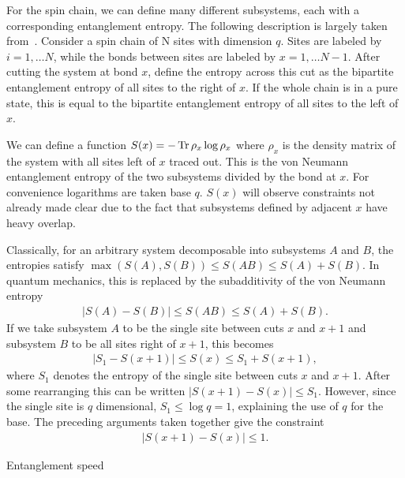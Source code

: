 For the spin chain, we can define many different subsystems, each with a corresponding entanglement entropy. The following description is largely taken from~\cite{Nahum2017}. Consider a spin chain of N sites with dimension $q$. Sites are labeled by $i=1,\dots N$, while the bonds between sites are labeled by $x = 1,\dots N-1$. After cutting the system at bond $x$, define the entropy across this cut as the bipartite entanglement entropy of all sites to the right of $x$. If the whole chain is in a pure state, this is equal to the bipartite entanglement entropy of all sites to the left of $x$.

We can define a function $S(x) = -\operatorname{Tr}\rho_x\log\rho_x$ where $\rho_x$ is the density matrix of the system with all sites left of $x$ traced out. This is the von Neumann entanglement entropy of the two subsystems divided by the bond at $x$. For convenience logarithms are taken base $q$. $S(x)$ will observe constraints not already made clear due to the fact that subsystems defined by adjacent $x$ have heavy overlap.

Classically, for an arbitrary system decomposable into subsystems $A$ and $B$, the entropies satisfy $\max(S(A), S(B)) \leq S(AB)\leq S(A) + S(B)$. In quantum mechanics, this is replaced by the subadditivity of the von Neumann entropy 
\begin{align}
\left|S(A)-S(B)\right| \leq S(AB)\leq S(A) + S(B). \label{eqn:subadd}
\end{align}
If we take subsystem $A$ to be the single site between cuts $x$ and $x+1$ and subsystem $B$ to be all sites right of $x+1$, this becomes
\begin{align}
\left|S_1 - S(x+1)\right| \leq S(x) \leq S_1 + S(x+1),
\end{align}
where $S_1$ denotes the entropy of the single site between cuts $x$ and $x+1$. After some rearranging this can be written $\left|S(x+1) - S(x)\right| \leq S_1$. However, since the single site is $q$ dimensional, $S_1 \leq \log q = 1$, explaining the use of $q$ for the base. The preceding arguments taken together give the constraint
\begin{align}
\left|S(x+1) - S(x)\right| \leq 1. \label{eqn:offbyone}
\end{align}

Entanglement speed

